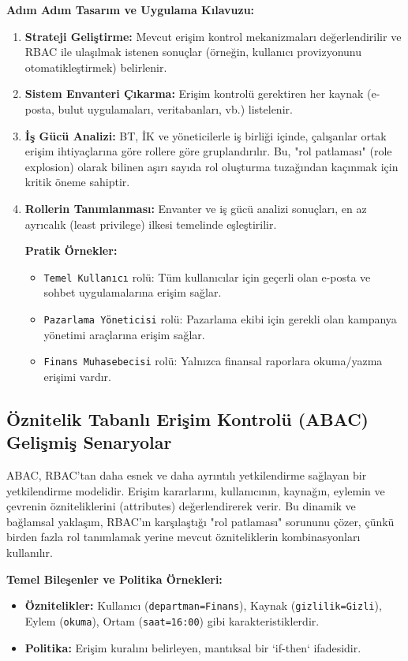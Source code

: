 \textbf{Adım Adım Tasarım ve Uygulama Kılavuzu:}
\begin{enumerate}
    \item \textbf{Strateji Geliştirme:} Mevcut erişim kontrol mekanizmaları değerlendirilir ve RBAC ile ulaşılmak istenen sonuçlar (örneğin, kullanıcı provizyonunu otomatikleştirmek) belirlenir.
    \item \textbf{Sistem Envanteri Çıkarma:} Erişim kontrolü gerektiren her kaynak (e-posta, bulut uygulamaları, veritabanları, vb.) listelenir.
    \item \textbf{İş Gücü Analizi:} BT, İK ve yöneticilerle iş birliği içinde, çalışanlar ortak erişim ihtiyaçlarına göre rollere göre gruplandırılır. Bu, "rol patlaması" (role explosion) olarak bilinen aşırı sayıda rol oluşturma tuzağından kaçınmak için kritik öneme sahiptir.
    \item \textbf{Rollerin Tanımlanması:} Envanter ve iş gücü analizi sonuçları, en az ayrıcalık (least privilege) ilkesi temelinde eşleştirilir.
    
    \textbf{Pratik Örnekler:}
    \begin{itemize}
        \item \verb|Temel Kullanıcı| rolü: Tüm kullanıcılar için geçerli olan e-posta ve sohbet uygulamalarına erişim sağlar.
        \item \verb|Pazarlama Yöneticisi| rolü: Pazarlama ekibi için gerekli olan kampanya yönetimi araçlarına erişim sağlar.
        \item \verb|Finans Muhasebecisi| rolü: Yalnızca finansal raporlara okuma/yazma erişimi vardır.
    \end{itemize}
\end{enumerate}

\subsection{Öznitelik Tabanlı Erişim Kontrolü (ABAC) Gelişmiş Senaryolar}

ABAC, RBAC'tan daha esnek ve daha ayrıntılı yetkilendirme sağlayan bir yetkilendirme modelidir. Erişim kararlarını, kullanıcının, kaynağın, eylemin ve çevrenin özniteliklerini (attributes) değerlendirerek verir. Bu dinamik ve bağlamsal yaklaşım, RBAC'ın karşılaştığı "rol patlaması" sorununu çözer, çünkü birden fazla rol tanımlamak yerine mevcut özniteliklerin kombinasyonları kullanılır.

\textbf{Temel Bileşenler ve Politika Örnekleri:}
\begin{itemize}
    \item \textbf{Öznitelikler:} Kullanıcı (\verb|departman=Finans|), Kaynak (\verb|gizlilik=Gizli|), Eylem (\verb|okuma|), Ortam (\verb|saat=16:00|) gibi karakteristiklerdir.
    \item \textbf{Politika:} Erişim kuralını belirleyen, mantıksal bir `if-then` ifadesidir.
\end{itemize}

